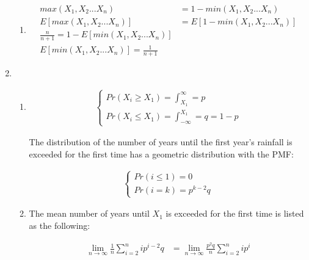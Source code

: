 \documentclass[11pt,letterpaper,titlepage]{article}
\begin{document}
\begin{enumerate}
\begin{enumerate}
        \item
        
        \begin{equation*}
            \begin{aligned}
                max(X_1, X_2...X_n) &= 1 - min(X_1, X_2...X_n) \\
                E[max(X_1, X_2...X_n)] &= E[1 - min(X_1, X_2...X_n)] \\
                \frac{n}{n+1} = 1 - E[min(X_1, X_2...X_n)] \\
                E[min(X_1, X_2...X_n)] = \frac{1}{n+1}
            \end{aligned}
        \end{equation*}
        
    \end{enumerate}
    
    \item %
    
    \begin{enumerate}
        \item 
        
        \begin{gather*}
            \begin{cases} 
            Pr(X_i \geq X_1) = \int_{X_1}^{\infty} = p \\
            Pr(X_i \leq X_1) = \int_{-\infty}^{X_1} = q = 1 - p
            \end{cases}
        \end{gather*}
        
        The distribution of the number of years until the first year's rainfall is exceeded for the first time has a geometric distribution with the PMF:
        
        \begin{gather*}
            \begin{cases}
            Pr(i \leq 1) = 0 \\
            Pr(i = k) = p^{k-2} q
            \end{cases}
        \end{gather*}
        
        \item 
        
        The mean number of years until $X_1$ is exceeded for the first time is listed as the following:
        
        \begin{equation*}
            \begin{aligned}
                \lim_{n \rightarrow \infty} \frac{1}{n} \sum_{i = 2}^{n} i p^{i-2} q &= \lim_{n \rightarrow \infty} \frac{p^2 q}{n}  \sum_{i = 2}^{n} i p^{i}
            \end{aligned}
        \end{equation*}
        

\end{enumerate}
\end{enumerate}
\end{document}
